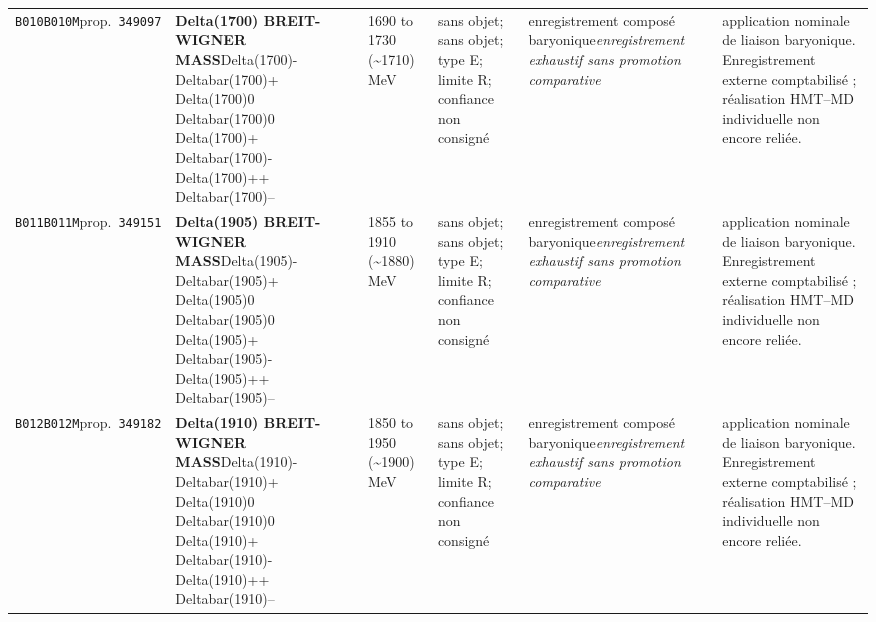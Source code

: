 \begin{landscape}
\begin{longtable}{L{1.85cm}L{4.45cm}L{2.35cm}L{4.05cm}L{3.35cm}L{7.15cm}}
\texttt{B010}\newline \texttt{B010M}\newline prop.\ \texttt{349097} & \textbf{Delta(1700) BREIT-WIGNER MASS}\newline Delta(1700)- \textbar{}\allowbreak{} Deltabar(1700)+ \textbar{}\allowbreak{} Delta(1700)0 \textbar{}\allowbreak{} Deltabar(1700)0 \textbar{}\allowbreak{} Delta(1700)+ \textbar{}\allowbreak{} Deltabar(1700)- \textbar{}\allowbreak{} Delta(1700)++ \textbar{}\allowbreak{} Deltabar(1700)-- & 1690 to 1730 (\textasciitilde{}1710)\,MeV & sans objet; sans objet; type E; limite R; confiance non consigné & enregistrement composé baryonique\newline \emph{enregistrement exhaustif sans promotion comparative} & application nominale de liaison baryonique. Enregistrement externe comptabilisé ; réalisation HMT--MD individuelle non encore reliée. \\
\texttt{B011}\newline \texttt{B011M}\newline prop.\ \texttt{349151} & \textbf{Delta(1905) BREIT-WIGNER MASS}\newline Delta(1905)- \textbar{}\allowbreak{} Deltabar(1905)+ \textbar{}\allowbreak{} Delta(1905)0 \textbar{}\allowbreak{} Deltabar(1905)0 \textbar{}\allowbreak{} Delta(1905)+ \textbar{}\allowbreak{} Deltabar(1905)- \textbar{}\allowbreak{} Delta(1905)++ \textbar{}\allowbreak{} Deltabar(1905)-- & 1855 to 1910 (\textasciitilde{}1880)\,MeV & sans objet; sans objet; type E; limite R; confiance non consigné & enregistrement composé baryonique\newline \emph{enregistrement exhaustif sans promotion comparative} & application nominale de liaison baryonique. Enregistrement externe comptabilisé ; réalisation HMT--MD individuelle non encore reliée. \\
\texttt{B012}\newline \texttt{B012M}\newline prop.\ \texttt{349182} & \textbf{Delta(1910) BREIT-WIGNER MASS}\newline Delta(1910)- \textbar{}\allowbreak{} Deltabar(1910)+ \textbar{}\allowbreak{} Delta(1910)0 \textbar{}\allowbreak{} Deltabar(1910)0 \textbar{}\allowbreak{} Delta(1910)+ \textbar{}\allowbreak{} Deltabar(1910)- \textbar{}\allowbreak{} Delta(1910)++ \textbar{}\allowbreak{} Deltabar(1910)-- & 1850 to 1950 (\textasciitilde{}1900)\,MeV & sans objet; sans objet; type E; limite R; confiance non consigné & enregistrement composé baryonique\newline \emph{enregistrement exhaustif sans promotion comparative} & application nominale de liaison baryonique. Enregistrement externe comptabilisé ; réalisation HMT--MD individuelle non encore reliée. \\

\end{longtable}
\end{landscape}
